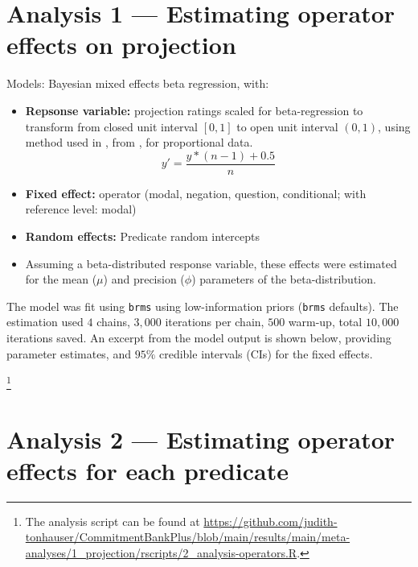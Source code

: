 \documentclass[a4paper,12pt,twoside]{article}
\begin{document}
\section{Analysis 1 --- Estimating operator effects on projection} \label{app:analysis-1}
    Models: Bayesian mixed effects beta regression, with:
    \begin{itemize}
        \item \textbf{Repsonse variable:} projection ratings scaled for beta-regression to transform from closed unit interval $[0,1]$ to open unit interval $(0,1)$,  using method used in \cite{degen_are_2022}, from \cite{smithson_better_2006}, for proportional data.
            $$y' = \frac{y * (n - 1) + 0.5}{n}$$
        
        \item \noindent\textbf{Fixed effect:} operator (modal, negation, question, conditional; with reference level: modal)
        
        \item \textbf{Random effects:} Predicate random intercepts

        \item Assuming a beta-distributed response variable, these effects were estimated for the mean ($\mu$) and precision ($\phi$) parameters of the beta-distribution.
        
    \end{itemize}

    \noindent The model was fit using \texttt{brms}
    using low-information priors (\texttt{brms} defaults). The estimation used $4$ chains, $3,000$ iterations per chain, $500$ warm-up, total $10,000$ iterations saved. An excerpt from the model output is shown below, providing parameter estimates, and $95\%$ credible intervals (CIs) for the fixed effects.
     
    

    \footnote{The analysis script can be found at \url{https://github.com/judith-tonhauser/CommitmentBankPlus/blob/main/results/main/meta-analyses/1_projection/rscripts/2_analysis-operators.R}.}


\section{Analysis 2 --- Estimating operator effects for each predicate} \label{app:analysis-2}
\end{document}
